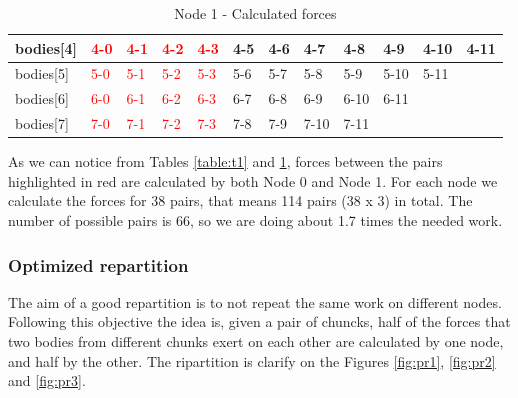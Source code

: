 \documentclass[a4paper]{article}
\begin{document}
\begin{table}[]
\centering
\caption{Node 1 - Calculated forces}
\label{table:t2}
\begin{tabular}{l|lllllllllll}
bodies{[}4{]} & \textcolor{red}{4-0} & \textcolor{red}{4-1} & \textcolor{red}{4-2} & \textcolor{red}{4-3} & 4-5 & 4-6 & 4-7  & 4-8  & 4-9  & 4-10 & 4-11 \\ \hline
bodies{[}5{]} & \textcolor{red}{5-0} & \textcolor{red}{5-1} & \textcolor{red}{5-2} & \textcolor{red}{5-3} & 5-6 & 5-7 & 5-8  & 5-9  & 5-10 & 5-11 &      \\ \hline
bodies{[}6{]} & \textcolor{red}{6-0} & \textcolor{red}{6-1} & \textcolor{red}{6-2} & \textcolor{red}{6-3} & 6-7 & 6-8 & 6-9  & 6-10 & 6-11 &      &      \\ \hline
bodies{[}7{]} & \textcolor{red}{7-0} & \textcolor{red}{7-1} & \textcolor{red}{7-2} & \textcolor{red}{7-3} & 7-8 & 7-9 & 7-10 & 7-11 &      &      &     
\end{tabular}
\end{table}

As we can notice from Tables \ref{table:t1} and \ref{table:t2}, forces between the pairs highlighted in red are calculated by both Node 0 and Node 1. For each node we calculate the forces for 38 pairs, that means 114 pairs (38 x 3) in total. The number of possible pairs is 66, so we are doing about 1.7 times the needed work.

\subsubsection{Optimized repartition}
\label{sec:opt_rep}
The aim of a good repartition is to not repeat the same work on different nodes. Following this objective the idea is, given a pair of chuncks, half of the forces that two bodies from different chunks exert on each other are calculated by one node, and half by the other. The ripartition is clarify on the Figures \ref{fig:pr1}, \ref{fig:pr2} and \ref{fig:pr3}.
\end{document}
